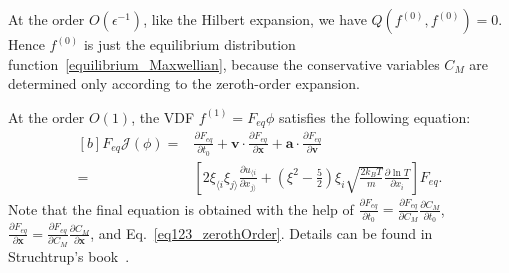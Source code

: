 



At the order $O(\epsilon^{-1})$, like the Hilbert expansion, we have $Q(f^{(0)},f^{(0)})=0$. Hence $f^{(0)}$ is just the equilibrium distribution function~\eqref{equilibrium_Maxwellian}, because the conservative variables $C_M$ are determined only according to the zeroth-order expansion. 

At the order $O(1)$, the VDF $f^{(1)}=F_{eq}\phi$ satisfies the following equation:
\begin{equation}\label{integral_solution}
\begin{aligned}[b]
F_{eq}\mathcal{J}(\phi)=&\frac{\partial F_{eq}}{\partial t_0}+\bm{v}\cdot\frac{\partial F_{eq}}{\partial
	\bm{x}}+\bm{a}\cdot\frac{\partial F_{eq}}{\partial \bm{v}}\\
=&\left[
2\xi_{\langle{i}} \xi_{j\rangle}
\frac{\partial u_{\langle{i}}}{\partial x_{j\rangle}}
+\left(\xi^2-\frac{5}{2}\right)\xi_i\sqrt{\frac{2k_BT}{m}}\frac{\partial \ln{T}}{\partial x_i}
\right]F_{eq}.
\end{aligned}
\end{equation}
Note that the final equation is obtained with the help of $\frac{\partial F_{eq}}{\partial t_0}=
\frac{\partial F_{eq}}{\partial C_M}
\frac{\partial C_M}{\partial t_0}$,  $\frac{\partial F_{eq}}{\partial \bm{x}}=
\frac{\partial F_{eq}}{\partial C_M}
\frac{\partial C_M}{\partial \bm{x}}$, and Eq.~\eqref{eq123_zerothOrder}. Details can be found in Struchtrup's book~\cite{henning}.

